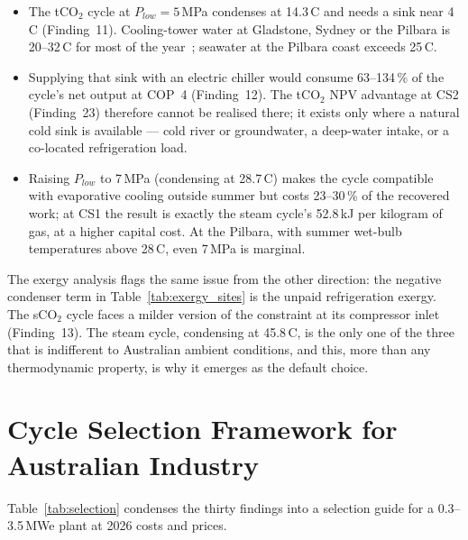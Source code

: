 \documentclass[12pt,a4paper]{report}
\begin{document}
\begin{itemize}[leftmargin=1.5em,itemsep=3pt]
\item The tCO$_2$ cycle at $P_{low} = 5$\,MPa condenses at 14.3\,\textdegree C
and needs a sink near 4\,\textdegree C (Finding~11). Cooling-tower water at
Gladstone, Sydney or the Pilbara is 20--32\,\textdegree C for most of the
year~\cite{BOM2024}; seawater at the Pilbara coast exceeds 25\,\textdegree C.
\item Supplying that sink with an electric chiller would consume 63--134\,\%
of the cycle's net output at COP~4 (Finding~12). The tCO$_2$ NPV advantage
at CS2 (Finding~23) therefore cannot be realised there; it exists only where
a natural cold sink is available --- cold river or groundwater, a deep-water
intake, or a co-located refrigeration load.
\item Raising $P_{low}$ to 7\,MPa (condensing at 28.7\,\textdegree C) makes
the cycle compatible with evaporative cooling outside summer but costs
23--30\,\% of the recovered work; at CS1 the result is exactly the steam
cycle's 52.8\,kJ per kilogram of gas, at a higher capital cost. At the
Pilbara, with summer wet-bulb temperatures above 28\,\textdegree C, even
7\,MPa is marginal.
\end{itemize}

The exergy analysis flags the same issue from the other direction: the
negative condenser term in Table~\ref{tab:exergy_sites} is the unpaid
refrigeration exergy. The sCO$_2$ cycle faces a milder version of the
constraint at its compressor inlet (Finding~13). The steam cycle, condensing
at 45.8\,\textdegree C, is the only one of the three that is indifferent to
Australian ambient conditions, and this, more than any thermodynamic
property, is why it emerges as the default choice.

\section{Cycle Selection Framework for Australian Industry}
\label{sec:discussion_framework}

Table~\ref{tab:selection} condenses the thirty findings into a selection
guide for a 0.3--3.5\,MWe plant at 2026 costs and prices.
\end{document}
